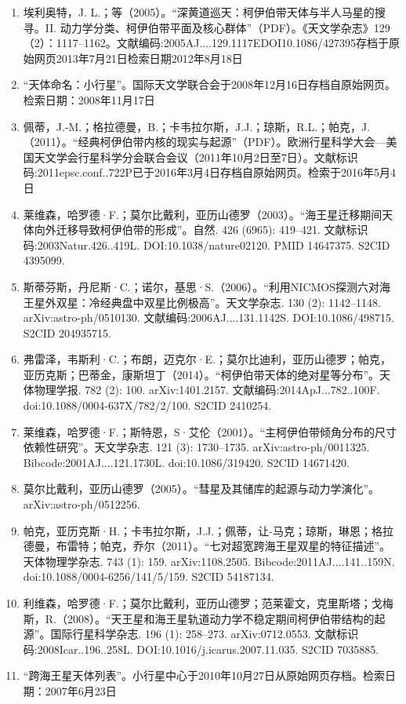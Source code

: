 \begin{enumerate}
\item 埃利奥特，J. L.；等（2005）。“深黄道巡天：柯伊伯带天体与半人马星的搜寻。II. 动力学分类、柯伊伯带平面及核心群体”（PDF）。《天文学杂志》129（2）：1117–1162。文献编码:2005AJ....129.1117EDOI10.1086/427395存档于原始网页2013年7月21日检索日期2012年8月18日
\item “天体命名：小行星”。国际天文学联合会于2008年12月16日存档自原始网页。检索日期：2008年11月17日
\item 佩蒂，J.-M.；格拉德曼，B.；卡韦拉尔斯，J.J.；琼斯，R.L.；帕克，J.（2011）。“经典柯伊伯带内核的现实与起源”（PDF）。欧洲行星科学大会—美国天文学会行星科学分会联合会议（2011年10月2日至7日）。文献标识码:2011epsc.conf..722P已于2016年3月4日存档自原始网页。检索于2016年5月4日
\item 莱维森，哈罗德·F.；莫尔比戴利，亚历山德罗（2003）。“海王星迁移期间天体向外迁移导致柯伊伯带的形成”。自然. 426 (6965): 419–421. 文献标识码:2003Natur.426..419L. DOI:10.1038/nature02120. PMID 14647375. S2CID 4395099.
\item 斯蒂芬斯，丹尼斯·C.；诺尔，基思·S.（2006）。“利用NICMOS探测六对海王星外双星：冷经典盘中双星比例极高”。天文学杂志. 130 (2): 1142–1148. arXiv:astro-ph/0510130. 文献编码:2006AJ....131.1142S. DOI:10.1086/498715. S2CID 204935715.
\item 弗雷泽，韦斯利·C.；布朗，迈克尔·E.；莫尔比迪利，亚历山德罗；帕克，亚历克斯；巴蒂金，康斯坦丁（2014）。“柯伊伯带天体的绝对星等分布”。天体物理学报. 782 (2): 100. arXiv:1401.2157. 文献编码:2014ApJ...782..100F. doi:10.1088/0004-637X/782/2/100. S2CID 2410254.
\item 莱维森，哈罗德·F.；斯特恩，S·艾伦（2001）。“主柯伊伯带倾角分布的尺寸依赖性研究”。天文学杂志. 121 (3): 1730–1735. arXiv:astro-ph/0011325. Bibcode:2001AJ....121.1730L. doi:10.1086/319420. S2CID 14671420.
\item 莫尔比戴利，亚历山德罗（2005）。“彗星及其储库的起源与动力学演化”。arXiv:astro-ph/0512256.
\item 帕克，亚历克斯·H.；卡韦拉尔斯，J.J.；佩蒂，让-马克；琼斯，琳恩；格拉德曼，布雷特；帕克，乔尔（2011）。“七对超宽跨海王星双星的特征描述”。天体物理学杂志. 743 (1): 159. arXiv:1108.2505. Bibcode:2011AJ....141..159N. doi:10.1088/0004-6256/141/5/159. S2CID 54187134.
\item 利维森，哈罗德·F.；莫尔比戴利，亚历山德罗；范莱霍文，克里斯塔；戈梅斯，R.（2008）。“天王星和海王星轨道动力学不稳定期间柯伊伯带结构的起源”。国际行星科学杂志. 196 (1): 258–273. arXiv:0712.0553. 文献标识码:2008Icar..196..258L. DOI:10.1016/j.icarus.2007.11.035. S2CID 7035885.
\item “跨海王星天体列表”。小行星中心于2010年10月27日从原始网页存档。检索日期：2007年6月23日

\end{enumerate}
